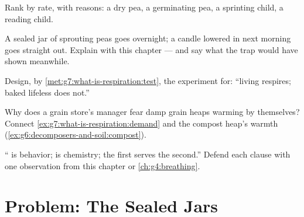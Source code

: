 \begin{exercise}[$\star\star$]\label{exo:g7:what-is-respiration:8}
Rank by  rate, with reasons: a dry pea, a
germinating pea, a sprinting child, a reading child.
\end{exercise}

\begin{exercise}[$\star\star$]\label{exo:g7:what-is-respiration:9}
A sealed jar of sprouting peas goes overnight; a candle
lowered in next morning goes straight out. Explain with
this chapter --- and say what the  trap would
have shown meanwhile.
\end{exercise}

\begin{exercise}[$\star\star$]\label{exo:g7:what-is-respiration:10}
Design, by \cref{met:g7:what-is-respiration:test}, the
experiment for: ``living  respires; baked lifeless
 does not.''
\end{exercise}

\begin{exercise}[$\star\star$]\label{exo:g7:what-is-respiration:11}
Why does a grain store's manager fear damp grain heaps
warming by themselves? Connect
\cref{ex:g7:what-is-respiration:demand} and the compost
heap's warmth
(\cref{ex:g6:decomposers-and-soil:compost}).
\end{exercise}

\begin{exercise}[$\star\star\star$]\label{exo:g7:what-is-respiration:12}
`` is behavior;  is chemistry; the
first serves the second.'' Defend each clause with one
observation from this chapter or
\cref{ch:g4:breathing}.
\end{exercise}

\section{Problem: The Sealed Jars}

